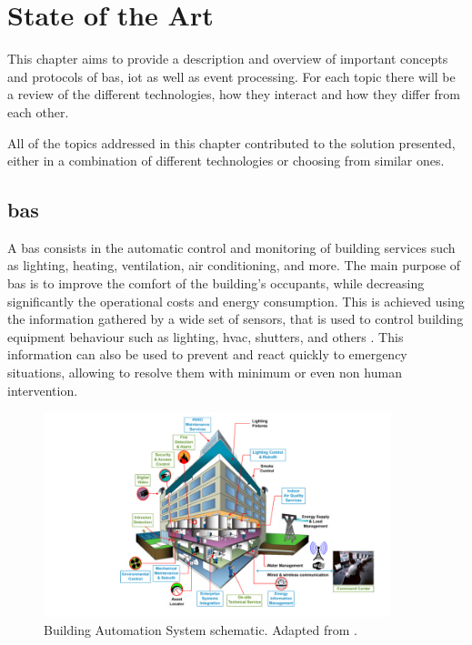 \chapter{State of the Art}
\label{chapter:state_of_the_art}

This chapter aims to provide a description and overview of important concepts and protocols of \acf{bas}, \acf{iot} as well as event processing. For each topic there will be a review of the different technologies, how they interact and how they differ from each other.

All of the topics addressed in this chapter contributed to the solution presented, either in a combination of different technologies or choosing from similar ones.

\section{\acf{bas}}

A \acf{bas} consists in the automatic control and monitoring of building services such as lighting, heating, ventilation, air conditioning, and more. The main purpose of \ac{bas} is to improve the comfort of the building's occupants, while decreasing significantly the operational costs and energy consumption. This is achieved using the information gathered by a wide set of sensors, that is used to control building equipment behaviour such as lighting, \ac{hvac}, shutters, and others \cite{Brambley2005}. This information can also be used to prevent and react quickly to emergency situations, allowing to resolve them with minimum or even non human intervention.

\begin{figure}[H]
	\centering
	\includegraphics[width=0.9\textwidth]{figures/smart-building.jpg}
	\caption{Building Automation System schematic. Adapted from \cite{image-BAS}. }
	\label{fig:smart-building}
\end{figure}

